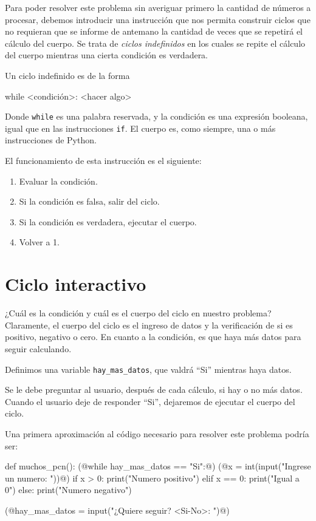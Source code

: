 Para poder resolver este problema sin averiguar primero la cantidad de números
a procesar, debemos introducir una instrucción que nos permita construir ciclos
que no requieran que se informe de antemano la cantidad de veces que se
repetirá el cálculo del cuerpo.  Se trata de {\it ciclos indefinidos} en los
cuales se repite el cálculo del cuerpo mientras una cierta condición es
verdadera.

Un ciclo indefinido es de la forma

\begin{codigo-python-sn}
while <condición>:
    <hacer algo>
\end{codigo-python-sn}

Donde \lstinline+while+ es una palabra reservada, y la condición es una expresión
booleana, igual que en las instrucciones \lstinline!if!. El cuerpo es, como
siempre, una o más instrucciones de Python.

El funcionamiento de esta instrucción es el siguiente:

\begin{enumerate}
\item Evaluar la condición.
\item Si la condición es falsa, salir del ciclo.
\item Si la condición es verdadera, ejecutar el cuerpo.
\item Volver a 1.
\end{enumerate}

\section{Ciclo interactivo}

¿Cuál es la condición y cuál es el cuerpo del ciclo en nuestro problema?
Claramente, el cuerpo del ciclo es el ingreso de datos y la verificación de si
es positivo, negativo o cero.  En cuanto a la condición, es que haya más datos
para seguir calculando.

Definimos una variable \lstinline!hay_mas_datos!, que valdrá ``Si'' mientras
haya datos.

Se le debe preguntar al usuario, después de cada cálculo, si hay o no más datos.
Cuando el usuario deje de responder ``Si'', dejaremos de ejecutar el cuerpo del
ciclo.

Una primera aproximación al código necesario para resolver este problema podría
ser:

\begin{codigo-python-sn}
def muchos_pcn():
    (@while hay_mas_datos == "Si":@)
        (@x = int(input("Ingrese un numero: "))@)
        if x > 0:
            print("Numero positivo")
        elif x == 0:
            print("Igual a 0")
        else:
            print("Numero negativo")

        (@hay_mas_datos = input("¿Quiere seguir? <Si-No>: ")@)
\end{codigo-python-sn}

